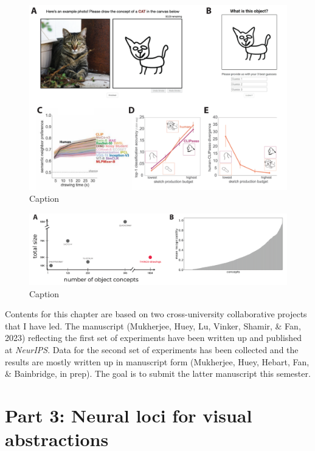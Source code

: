 \documentclass{Dissertate}
\begin{document}
\begin{figure}[htpb!]
    \centering
    \includegraphics[width=.8\linewidth]{proposal/figures/chap4.pdf}
    \caption{Caption}
    \label{fig:enter-label}
\end{figure}


\begin{figure}[htpb!]
    \centering
    \includegraphics[width=.8\linewidth]{proposal/figures/chap4b.pdf}
    \caption{Caption}
    \label{fig:enter-label}
\end{figure}



\begin{tcolorbox}[
    colback=gray!10,  %
    colframe=black!50, %
    arc=4mm,         %
    boxrule=2pt      %
]
Contents for this chapter are based on two cross-university collaborative projects that I have led. 
The manuscript (Mukherjee, Huey, Lu, Vinker, Shamir, \& Fan, 2023) reflecting the first set of experiments have been written up and published at \textit{NeurIPS}.
Data for the second set of experiments has been collected and the results are mostly written up in manuscript form (Mukherjee, Huey, Hebart, Fan, \& Bainbridge, in prep).
The goal is to submit the latter manuscript this semester.
\end{tcolorbox}



\section*{\textbf{Part 3: Neural loci for visual abstractions}}
\end{document}
